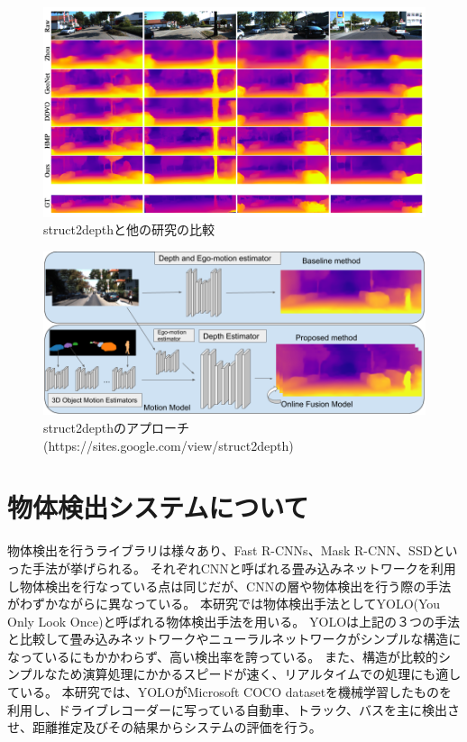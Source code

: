 \begin{figure}[hp]
  \begin{center}
   \includegraphics[width=\textwidth]{figs/struct2depth_related.png}
  \end{center}
  \caption{struct2depthと他の研究の比較\cite{casser2019struct2depth}}
  \label{fig:depth_related}
\end{figure}

\begin{figure}[hp]
  \begin{center}
   \includegraphics[width=\textwidth]{figs/aproach_depth.png}
  \end{center}
  \caption{struct2depthのアプローチ(https://sites.google.com/view/struct2depth)}
  \label{fig:approach_depth}
\end{figure}

\newpage
\section{物体検出システムについて}
物体検出を行うライブラリは様々あり、Fast R-CNNs\cite{ren2015faster}、Mask R-CNN\cite{he2017mask}、SSD\cite{liu2016ssd}といった手法が挙げられる。
それぞれCNNと呼ばれる畳み込みネットワークを利用し物体検出を行なっている点は同じだが、CNNの層や物体検出を行う際の手法がわずかながらに異なっている。
本研究では物体検出手法としてYOLO(You Only Look Once)\cite{yolov3}と呼ばれる物体検出手法を用いる。
YOLOは上記の３つの手法と比較して畳み込みネットワークやニューラルネットワークがシンプルな構造になっているにもかかわらず、高い検出率を誇っている。
また、構造が比較的シンプルなため演算処理にかかるスピードが速く、リアルタイムでの処理にも適している。
本研究では、YOLOがMicrosoft COCO datasetを機械学習したものを利用し、ドライブレコーダーに写っている自動車、トラック、バスを主に検出させ、距離推定及びその結果からシステムの評価を行う。


